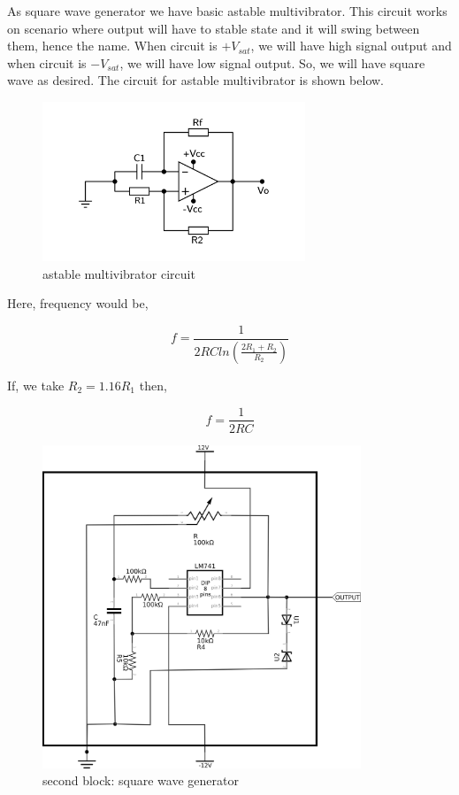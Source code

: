 \documentclass{article}
\begin{document}
As square wave generator we have basic astable multivibrator. This circuit works on scenario where output will have to stable state and it will swing between them, hence the name. When circuit is \(+V_{sat}\), we will have high signal output and when circuit is \(-V_{sat}\), we will have low signal output. So, we will have square wave as desired. The circuit for astable multivibrator is shown below.

\begin{figure}[H]
    \centering
    \label{square}
    \includegraphics[width=0.7\textwidth]{imgs/square.png}
    \caption{astable multivibrator circuit}
\end{figure}


Here, frequency would be, 

\begin{equation}
\label{eq:org77f350e}
  f =\frac{1}{2 RC ln(\frac{2R_{1}+R_{2}}{R_{2}})}
\end{equation}

If, we take \(R_{2}=1.16R_{1}\) then, 

\begin{equation}
\label{eq:orgd07ae13}
  f =\frac{1}{2RC}
\end{equation}


\begin{figure}[H]
    \centering
    \label{squarereal}
    \includegraphics[width=0.85\textwidth]{imgs/squarereal.png}
    \caption{second block: square wave generator}
\end{figure}
\end{document}
